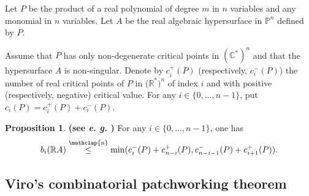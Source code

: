 \documentclass[12pt]{article}
\newcommand\customleq{\stackrel{\mathclap{\normalfont\scriptsize\mbox{n}}}{\leq}}
\renewcommand{\P}{\mathbb{P}}
\theoremstyle{definition}
\newtheorem{prop}{Proposition}[section]
\begin{document}
\label{section_morse_ineq}

\begin{sloppypar}
    Let $P$ be the product of a real polynomial of degree $m$ in $n$ variables and any monomial in $n$ variables. Let $A$ be the real algebraic hypersurface in $\P^n$ defined by $P$.
\end{sloppypar}

\begin{sloppypar}
    Assume that $P$ has only non-degenerate critical points in $(\mathbb{C}^*)^n$ and that the hypersurface $A$ is non-singular. Denote by $c_i^+(P)$ (respectively, $c_i^-(P)$) the number of real critical points of $P$ in ($\mathbb{R}^*)^n$ of index $i$ and with positive (respectively, negative) critical value. For any $i \in \{ 0,...,n-1 \}$, put $c_i(P) = c_i^+(P) + c_i^-(P)$.
\end{sloppypar}

\begin{prop}
    \textbf{(see \textit{e. g.} \cite{itenbergshustincritpts})}
    For any $i \in \{0,...,n-1 \}$, one has 
    \begin{equation*}
        b_i(\mathbb{R}A) \customleq \mathrm{min}(c_i^-(P) + c_{n-i}^+(P), c_{n-i-1}^-(P) + c_{i+1}^+(P)).
    \end{equation*}
\end{prop}

\subsection{Viro's combinatorial patchworking theorem}
\end{document}
